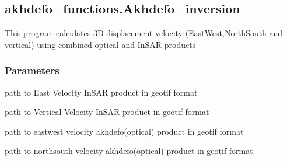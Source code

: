 \documentclass[letterpaper,10pt]{sphinxmanual}
\begin{document}
\subsection{akhdefo\_functions.Akhdefo\_inversion}
\label{\detokenize{generated/akhdefo_functions.Akhdefo_inversion:akhdefo-functions-akhdefo-inversion}}\label{\detokenize{generated/akhdefo_functions.Akhdefo_inversion::doc}}

\begin{fulllineitems}
\label{\detokenize{generated/akhdefo_functions.Akhdefo_inversion:akhdefo_functions.Akhdefo_inversion}}
\pysigstartsignatures
{}
\pysigstopsignatures
\sphinxAtStartPar
This program calculates 3D displacement velocity (East\sphinxhyphen{}West,North\sphinxhyphen{}South and vertical) using combined optical and InSAR products


\subsubsection{Parameters}
\label{\detokenize{generated/akhdefo_functions.Akhdefo_inversion:parameters}}\begin{description}
\sphinxAtStartPar
path to East Velocity InSAR product in geotif format

\sphinxAtStartPar
path to Vertical Velocity InSAR product in geotif format

\sphinxAtStartPar
path to east\sphinxhyphen{}west velocity  akhdefo(optical) product in geotif format

\sphinxAtStartPar
path to north\sphinxhyphen{}south velocity  akhdefo(optical) product in geotif format


\end{description}
\end{fulllineitems}
\end{document}
